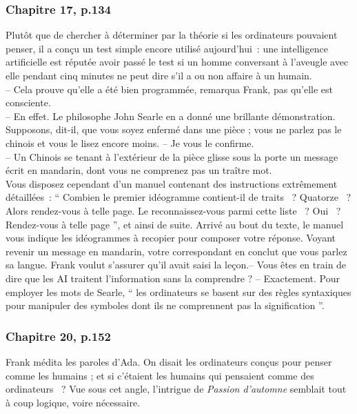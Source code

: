\documentclass{article}
\begin{document}
			\subsubsection{Chapitre 17, p.134}\label{ada_test_turing}
				Plutôt	 que	 de chercher	à	déterminer	par	la	théorie	si	les	ordinateurs	pouvaient	penser,	il a	 conçu	 un	 test	 simple	 encore utilisé	 aujourd'hui~:	 une	 intelligence artificielle	 est	 réputée	 avoir	 passé le	 test	 si	 un	 homme	 conversant	 à l'aveugle	avec	elle	pendant	cinq	minutes	ne	peut	dire	s'il	a	ou	non	affaire	à
				un	humain.\\
				--	 Cela	 prouve	 qu'elle	 a	 été	 bien	 programmée,	 remarqua	 Frank,	 pas
				qu'elle	est	consciente.\\
				--	 En	 effet.	 Le	 philosophe	 John	 Searle	 en	 a	 donné	 une	 brillante
				démonstration.	Supposons,	dit-il,	que	vous	soyez	enfermé	dans	une	pièce	;
				vous	ne	parlez	pas	le	chinois	et	vous	le	lisez	encore	moins.
				--	Je	vous	le	confirme.\\
				--	Un	Chinois	se	tenant	à	l'extérieur	de	la	pièce	glisse	sous	la	porte	un
				message	 écrit	 en	 mandarin,	 dont	 vous	 ne	 comprenez	 pas	 un	 traître	 mot.\\
				Vous	 disposez	 cependant	 d'un	 manuel	 contenant	 des	 instructions
				extrêmement	détaillées~:	``	Combien	le	premier	idéogramme	contient-il	de
				traits	~?	 Quatorze	~?	 Alors	 rendez-vous	 à	 telle	 page.	 Le	 reconnaissez-vous
				parmi	 cette	 liste	~?	 Oui	~?	 Rendez-vous	 à	 telle	 page	'',	 et	 ainsi	 de	 suite.
				Arrivé	 au	 bout	 du	 texte,	 le	 manuel	 vous	 indique	 les	 idéogrammes	 à
				recopier	 pour	 composer	 votre	 réponse.	 Voyant	 revenir	 un	 message	 en
				mandarin,	votre	correspondant	en	conclut	que	vous	parlez	sa	langue.
				Frank	voulut	s'assurer	qu'il	avait	saisi	la	leçon.--	Vous	êtes	en	train	de	dire	que	les	AI	traitent	l'information	sans	la
				comprendre	?
				--	Exactement.	Pour	employer	les	mots	de	Searle,	``	les	ordinateurs	se
				basent	sur	des	règles	syntaxiques	pour	manipuler	des	symboles	dont	ils	ne
				comprennent	pas	la	signification	''.
			\subsubsection{Chapitre 20, p.152}\label{ada_mimesis}
				Frank	médita	les	paroles	d'Ada.	On	disait	les	ordinateurs	conçus	pour
				penser	 comme	 les	 humains	 ;	 et	 si	 c'étaient	 les	 humains	 qui	 pensaient
				comme	 des	 ordinateurs	~?	 Vue	 sous	 cet	 angle,	 l'intrigue	 de	 \textit{Passion
				d'automne}	semblait	tout	à	coup	logique,	voire	nécessaire.
\end{document}
